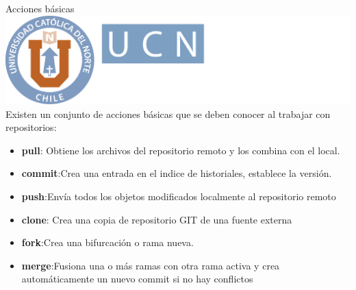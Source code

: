 \documentclass[12pt,a4paper,usenames,x11names,compress]{beamer}
\begin{document}
\begin{frame}{Acciones básicas \hfill \includegraphics[scale=.1]{eciem.png}}
Existen un conjunto de acciones básicas que se deben conocer al trabajar con repositorios:
\begin{itemize}
\justifying
\item \textbf{pull}: Obtiene los archivos del repositorio remoto y los combina con el local.
\item \textbf{commit}:Crea una entrada en el indice de historiales, establece la versión.
\item \textbf{push}:Envía todos los objetos modificados localmente al repositorio remoto
\item \textbf{clone}: Crea una copia de repositorio GIT de una fuente externa
\item \textbf{fork}:Crea una bifurcación o rama nueva.
\item \textbf{merge}:Fusiona una o más ramas con otra rama activa y crea automáticamente un nuevo commit si no hay conflictos
\end{itemize}
\end{frame}
\end{document}
